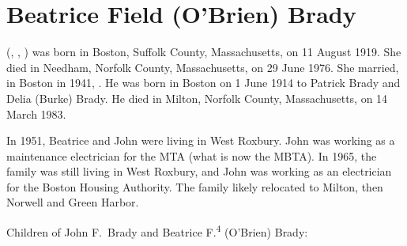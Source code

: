 \section{Beatrice Field (O'Brien) Brady}\label{per:Beatrice4OBrien}

 (, , ) was born in Boston, Suffolk County, Massachusetts, on 11 August 1919.\cite{Beatrice4OBrienBirth} She died in Needham, Norfolk County, Massachusetts, on 29 June 1976.\cite{Beatrice4OBrienDeath} She married, in Boston in 1941, .\cite{Beatrice4OBrienMarriage} He was born in Boston on 1 June 1914 to Patrick Brady and Delia (Burke) Brady.\cite{JohnBradyDraft,Census1920JohnBrady,PatrickBradyMarriage} He died in Milton, Norfolk County, Massachusetts, on 14 March 1983.\cite{JohnBradyDeath}

In 1951, Beatrice and John were living in West Roxbury. John was working as a maintenance electrician for the MTA (what is now the MBTA).\cite{JohnBrady1951,HistoryoftheT} In 1965, the family was still living in West Roxbury, and John was working as an electrician for the Boston Housing Authority.\cite{JohnBrady1965} The family likely relocated to Milton, then Norwell and Green Harbor.\cite{Beatrice4OBrienObit}

\begin{KidsIntro}
	Children of John F.\ Brady and Beatrice F.\textsuperscript{4} (O'Brien) Brady:
\end{KidsIntro}

\begin{Kids}
	\KidNum{}{$\bullet$}
	
	\KidNum{}{$\bullet$}
	
	\KidNum{}{$\bullet$}
	
	\KidNum{}{$\bullet$}
\end{Kids}

